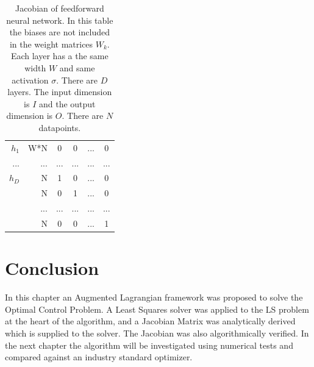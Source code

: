 \begin{table}
\begin{subtable}{\textwidth}
{\begin{tabular}{ r r | c c c c }
$h_1$ & W*N & 0 & 0 &...& 0 \\
...   & ... &...&...&...&...\\\hline
$h_D$ & N & 1 & 0 &...& 0 \\
      & N & 0 & 1 &...& 0  \\
      &...&...&...&...&...\\ 
      & N & 0 & 0 &...& 1  \\ \hline
\end{tabular}}
\end{subtable}
\caption{Jacobian of feedforward neural network. In this table the biases are not included in the weight matrices $W_k$. Each layer has a the same width $W$ and same activation $\sigma$. There are $D$ layers. The input dimension is $I$ and the output dimension is $O$. There are $N$ datapoints.}
\label{jac-tab}

\end{table}
\FloatBarrier
\section{Conclusion}
In this chapter an Augmented Lagrangian framework was proposed to solve the Optimal Control Problem. A Least Squares solver was applied to the LS problem at the heart of the algorithm, and a Jacobian Matrix was analytically derived which is supplied to the solver. The Jacobian was also algorithmically verified. In the next chapter the algorithm will be investigated using numerical tests and compared against an industry standard optimizer.



